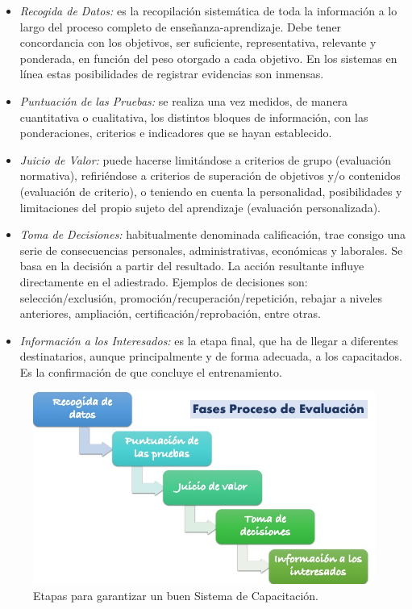 \begin{itemize}
\item \textsl{Recogida de Datos:} es la recopilación sistemática de toda la información a lo largo del proceso completo de enseñanza-aprendizaje. Debe tener concordancia con los objetivos, ser suficiente, representativa, relevante y ponderada, en función del peso otorgado a cada objetivo. En los sistemas en línea estas posibilidades de registrar evidencias son inmensas.
\item \textsl{Puntuación de las Pruebas:} se realiza una vez medidos, de manera cuantitativa o cualitativa, los distintos bloques de información, con las ponderaciones, criterios e indicadores que se hayan establecido.
\item \textsl{Juicio de Valor:} puede hacerse limitándose a criterios de grupo (evaluación normativa), refiriéndose a criterios de superación de objetivos y/o contenidos (evaluación de criterio), o teniendo en cuenta la personalidad, posibilidades y limitaciones del propio sujeto del aprendizaje (evaluación personalizada).
\item \textsl{Toma de Decisiones:} habitualmente denominada calificación, trae consigo una serie de consecuencias personales, administrativas, económicas y laborales. Se basa en la decisión a partir del resultado. La acción resultante influye directamente en el adiestrado. Ejemplos de decisiones son: selección/exclusión, promoción/recuperación/repetición, rebajar a niveles anteriores, ampliación, certificación/reprobación, entre otras.
\item \textsl{Información a los Interesados:} es la etapa final, que ha de llegar a diferentes destinatarios, aunque principalmente y de forma adecuada, a los capacitados. Es la confirmación de que concluye el entrenamiento.
\end{itemize}

\begin{figure}[h]
\centering
 \includegraphics[width=0.5\linewidth]{imagen/FasesEva.jpg}
 \caption{Etapas para garantizar un buen Sistema de Capacitación.}
 \label{fig:etapasEval} 
\end{figure}

